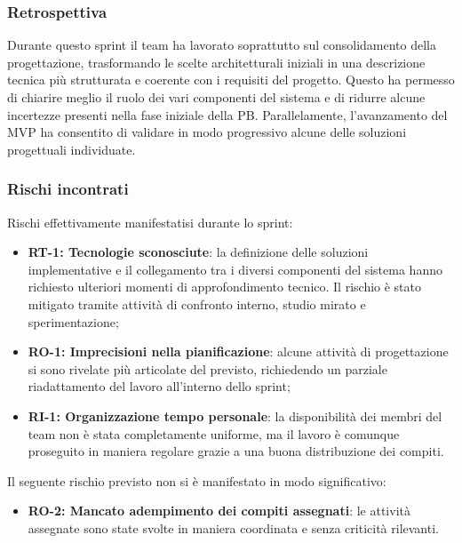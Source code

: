\documentclass[a4paper,12pt]{article}
\begin{document}
        
       \subsubsection{Retrospettiva}{
            Durante questo sprint il team ha lavorato soprattutto sul consolidamento della progettazione, trasformando le scelte architetturali iniziali in una descrizione tecnica più strutturata e coerente con i requisiti del progetto. Questo ha permesso di chiarire meglio il ruolo dei vari componenti del sistema e di ridurre alcune incertezze presenti nella fase iniziale della PB. Parallelamente, l'avanzamento del MVP ha consentito di validare in modo progressivo alcune delle soluzioni progettuali individuate.
        }

        \subsubsection{Rischi incontrati}{
            Rischi effettivamente manifestatisi durante lo sprint:
            \begin{itemize}
                \item \textbf{RT-1: Tecnologie sconosciute}: la definizione delle soluzioni implementative e il collegamento tra i diversi componenti del sistema hanno richiesto ulteriori momenti di approfondimento tecnico. Il rischio è stato mitigato tramite attività di confronto interno, studio mirato e sperimentazione;
                \item \textbf{RO-1: Imprecisioni nella pianificazione}: alcune attività di progettazione si sono rivelate più articolate del previsto, richiedendo un parziale riadattamento del lavoro all'interno dello sprint;
                \item \textbf{RI-1: Organizzazione tempo personale}: la disponibilità dei membri del team non è stata completamente uniforme, ma il lavoro è comunque proseguito in maniera regolare grazie a una buona distribuzione dei compiti.
            \end{itemize}

            Il seguente rischio previsto non si è manifestato in modo significativo:
            \begin{itemize}
                \item \textbf{RO-2: Mancato adempimento dei compiti assegnati}: le attività assegnate sono state svolte in maniera coordinata e senza criticità rilevanti.
            \end{itemize}
        }
\end{document}
